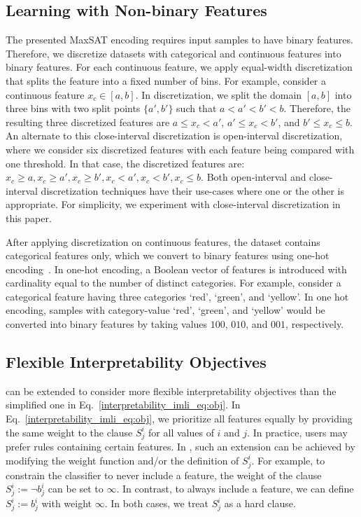 \subsection{Learning with Non-binary Features}
	\label{interpretability_imli_sec:non-binary}
	The presented MaxSAT encoding requires input samples to have binary features. Therefore, we discretize datasets with categorical and continuous features into binary features. For each continuous feature, we apply equal-width discretization that splits the feature into a fixed number of bins. For example, consider a continuous feature $ x_c \in [a,b] $. In discretization, we split the domain $ [a,b] $ into three bins with two split points $ \{a',b'\} $ such that $ a<a'<b'<b $.  Therefore, the resulting three discretized features are $ { a \le x_c < a'} $, $ {a' \le x_c < b'} $, and $ { b' \le x_c  \le b } $. An alternate to this close-interval discretization is open-interval discretization, where we consider six discretized features with each feature being compared with one threshold. In that case, the discretized features are: $ x_c \ge a, x_c \ge a', x_c \ge b', x_c < a', x_c < b', x_c \le b $. Both open-interval and close-interval discretization techniques have their use-cases where one or the other is appropriate. For simplicity, we experiment with close-interval discretization in this paper.
	
	After applying discretization on continuous features, the dataset contains categorical features only, which we convert to binary features using one-hot encoding~\cite{lakkaraju2019faithful,ghosh19imli}. In one-hot encoding, a Boolean vector of features is introduced with cardinality equal to the number of distinct categories. For example, consider a categorical feature having three categories `red', `green', and `yellow'. In one hot encoding, samples with category-value `red', `green', and `yellow' would be converted into binary features by taking values $ 100 $, $ 010 $, and $ 001 $, respectively. 
	
	
\subsection{Flexible Interpretability Objectives}
\label{interpretability_imli_sec:complex_interpretability_objectives}
{\imli} can be extended to consider more flexible interpretability objectives than the simplified one in Eq.~\eqref{interpretability_imli_eq:obj}. In Eq.~\eqref{interpretability_imli_eq:obj}, we prioritize all features equally by providing the same weight to the clause $ S_j^i $ for all  values of $ i $ and $ j $. In practice, users may prefer rules containing certain features. In {\imli}, such an extension can be achieved by modifying the weight function and/or the definition of  $ S_j^i $. For example, to constrain the classifier to never include a feature, the weight of the clause $ S_j^i := \neg b_j^i $ can be set to $ \infty $. In contrast, to always include a feature, we can define $ S_j^i := b_j^i $ with weight $ \infty $. In both cases, we treat $ S_j^i $ as a hard clause. 

